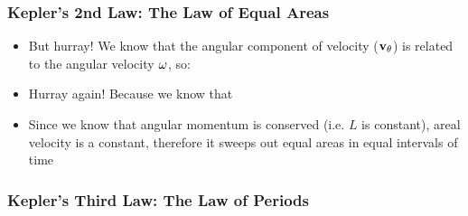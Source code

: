 \documentclass[12pt,compress,aspectratio=169]{beamer}
\newcommand{\mb}[1]{\ensuremath\mathbf{#1}}
\begin{document}
\begin{frame}
  \frametitle{Kepler's 2nd Law: The Law of Equal Areas}

  \begin{itemize}
  \item But hurray! We know that the angular component of velocity
    ($\mb{v}_\theta$) is related to the angular velocity $\mb{\omega}$, so:
    
  \item Hurray again! Because we know that
    
    \vspace{-.4in}{\Large
      \begin{displaymath}
        rv_\theta=|\mb{r}\times\mb{v}_\theta|=|\frac{\mb{L}}{\mu}|=\frac{L}{\mu}
        \quad\longrightarrow\quad
        \boxed{\frac{dA}{dt} =\frac{L}{2\mu}}
      \end{displaymath}
    }
  \item Since we know that angular momentum is conserved (i.e. $L$ is constant),
    areal velocity is a constant, therefore it sweeps out equal areas in equal
    intervals of time
  \end{itemize}
\end{frame}


\begin{frame}
  \frametitle{Kepler's Third Law: The Law of Periods}
  \begin{center}
  \end{center}
\end{frame}
\end{document}
